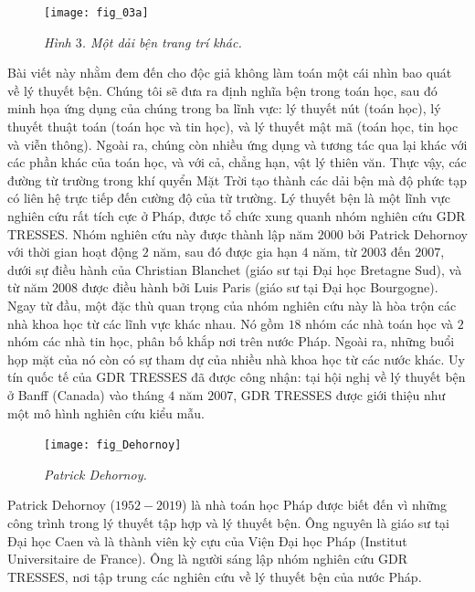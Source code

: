 \begin{multicols}{2}
\begin{figure}[H]
		\texttt{[image: fig\_03a]}
		\caption{\small\textit{\color{duongvaotoanhoc}Hình $3$. Một dải bện trang trí khác.}}
		\vspace*{-10pt}
	\end{figure}
	Bài viết này nhằm đem đến cho độc giả không làm toán một cái nhìn bao quát về lý thuyết bện. Chúng tôi sẽ đưa ra định nghĩa bện trong toán học, sau đó minh họa ứng dụng của chúng trong ba lĩnh vực: lý thuyết nút (toán học), lý thuyết thuật toán (toán học và tin học), và lý thuyết mật mã (toán học, tin học và viễn thông). Ngoài ra, chúng còn nhiều ứng dụng và tương tác qua lại khác với các phần khác của toán học, và với cả, chẳng hạn, vật lý thiên văn. Thực vậy, các đường từ trường trong khí quyển Mặt Trời tạo thành các dải bện mà độ phức tạp có liên hệ trực tiếp đến cường độ của từ trường.
	\vskip 0.1cm
	Lý thuyết bện là một lĩnh vực nghiên cứu rất tích cực ở Pháp, được tổ chức xung quanh nhóm nghiên cứu GDR TRESSES. Nhóm nghiên cứu này được thành lập năm $2000$ bởi Patrick Dehornoy với thời gian hoạt động $2$ năm, sau đó được gia hạn $4$ năm, từ $2003$ đến $2007$, dưới sự điều hành của Christian Blanchet (giáo sư tại Đại học Bretagne Sud), và từ năm $2008$ được điều hành bởi Luis Paris (giáo sư tại Đại học Bourgogne). Ngay từ đầu, một đặc thù quan trọng của nhóm nghiên cứu này là hòa trộn các nhà khoa học từ các lĩnh vực khác nhau. Nó gồm $18$ nhóm các nhà toán học và $2$ nhóm các nhà tin học, phân bố khắp nơi trên nước Pháp. Ngoài ra, những buổi họp mặt của nó còn có sự tham dự của nhiều nhà khoa học từ các nước khác. Uy tín quốc tế của GDR TRESSES đã được công nhận: tại hội nghị về lý thuyết bện ở Banff (Canada) vào tháng $4$ năm $2007$, GDR TRESSES được giới thiệu như một mô hình nghiên cứu kiểu mẫu.
	\begin{tBox}
		\begin{figure}
			\vspace*{-15pt}
			\centering
			\captionsetup{labelformat= empty, justification=centering}
			\hspace*{-13pt}\texttt{[image: fig\_Dehornoy]}
			\hspace*{-13pt}\caption{\small\textit{\color{duongvaotoanhoc}Patrick Dehornoy.}}
			\vspace*{-10pt}
		\end{figure}
		Patrick Dehornoy ($1952-2019$) là nhà toán học Pháp được biết đến vì những công trình trong lý thuyết tập hợp và lý thuyết bện. Ông nguyên là giáo sư tại Đại học Caen và là thành viên kỳ cựu của Viện Đại học Pháp (Institut Universitaire de France). Ông là người sáng lập nhóm nghiên cứu GDR TRESSES, nơi tập trung các nghiên cứu về lý thuyết bện của nước Pháp.

\end{tBox}
\end{multicols}
